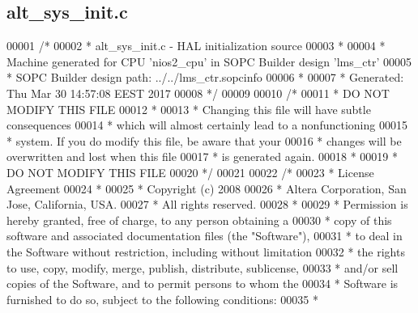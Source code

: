 \subsection{alt\+\_\+sys\+\_\+init.\+c}
\label{alt__sys__init_8c_source}

\begin{DoxyCode}
00001 \textcolor{comment}{/*}
00002 \textcolor{comment}{ * alt\_sys\_init.c - HAL initialization source}
00003 \textcolor{comment}{ *}
00004 \textcolor{comment}{ * Machine generated for CPU 'nios2\_cpu' in SOPC Builder design 'lms\_ctr'}
00005 \textcolor{comment}{ * SOPC Builder design path: ../../lms\_ctr.sopcinfo}
00006 \textcolor{comment}{ *}
00007 \textcolor{comment}{ * Generated: Thu Mar 30 14:57:08 EEST 2017}
00008 \textcolor{comment}{ */}
00009 
00010 \textcolor{comment}{/*}
00011 \textcolor{comment}{ * DO NOT MODIFY THIS FILE}
00012 \textcolor{comment}{ *}
00013 \textcolor{comment}{ * Changing this file will have subtle consequences}
00014 \textcolor{comment}{ * which will almost certainly lead to a nonfunctioning}
00015 \textcolor{comment}{ * system. If you do modify this file, be aware that your}
00016 \textcolor{comment}{ * changes will be overwritten and lost when this file}
00017 \textcolor{comment}{ * is generated again.}
00018 \textcolor{comment}{ *}
00019 \textcolor{comment}{ * DO NOT MODIFY THIS FILE}
00020 \textcolor{comment}{ */}
00021 
00022 \textcolor{comment}{/*}
00023 \textcolor{comment}{ * License Agreement}
00024 \textcolor{comment}{ *}
00025 \textcolor{comment}{ * Copyright (c) 2008}
00026 \textcolor{comment}{ * Altera Corporation, San Jose, California, USA.}
00027 \textcolor{comment}{ * All rights reserved.}
00028 \textcolor{comment}{ *}
00029 \textcolor{comment}{ * Permission is hereby granted, free of charge, to any person obtaining a}
00030 \textcolor{comment}{ * copy of this software and associated documentation files (the "Software"),}
00031 \textcolor{comment}{ * to deal in the Software without restriction, including without limitation}
00032 \textcolor{comment}{ * the rights to use, copy, modify, merge, publish, distribute, sublicense,}
00033 \textcolor{comment}{ * and/or sell copies of the Software, and to permit persons to whom the}
00034 \textcolor{comment}{ * Software is furnished to do so, subject to the following conditions:}
00035 \textcolor{comment}{ *}

\end{DoxyCode}
